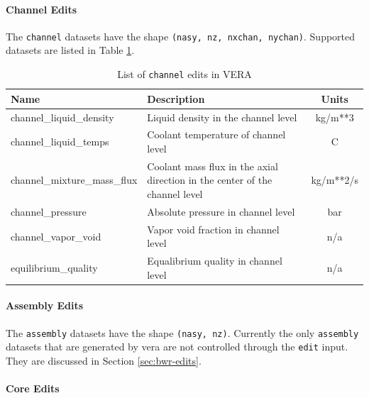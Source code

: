 \FloatBarrier

\paragraph{Channel Edits}\label{sec:channel-edits}

The \texttt{channel} datasets have the shape \texttt{(nasy, nz, nxchan, nychan)}.  Supported datasets are listed in Table \ref{tab:channel-edits}.

\begin{table}[h]
    \centering
    \caption{List of \texttt{channel} edits in VERA}
    \label{tab:channel-edits}
\begin{tabular}{|l|p{}|c|}\hline
   \textbf{Name} & \textbf{Description} & \textbf{Units} \\\hline
   channel\_liquid\_density & Liquid density in the channel level & kg/m**3 \\ \hline
   channel\_liquid\_temps & Coolant temperature of channel level & C \\\hline
   channel\_mixture\_mass\_flux & Coolant mass flux in the axial direction in the center of the channel level & kg/m**2/s \\ \hline
   channel\_pressure & Absolute pressure in channel level & bar \\ \hline
   channel\_vapor\_void & Vapor void fraction in channel level & n/a \\\hline
   equilibrium\_quality & Equalibrium quality in channel level & n/a \\ \hline
\end{tabular}

\end{table}

\FloatBarrier

\paragraph{Assembly Edits}\label{sec:assembly-edits}

The \texttt{assembly} datasets have the shape \texttt{(nasy, nz)}.  Currently the only \texttt{assembly} datasets that are generated by \ac{vera} are not controlled through the \texttt{edit} input.  They are discussed in Section \ref{sec:bwr-edits}.

\paragraph{Core Edits}\label{sec:core-edits}

